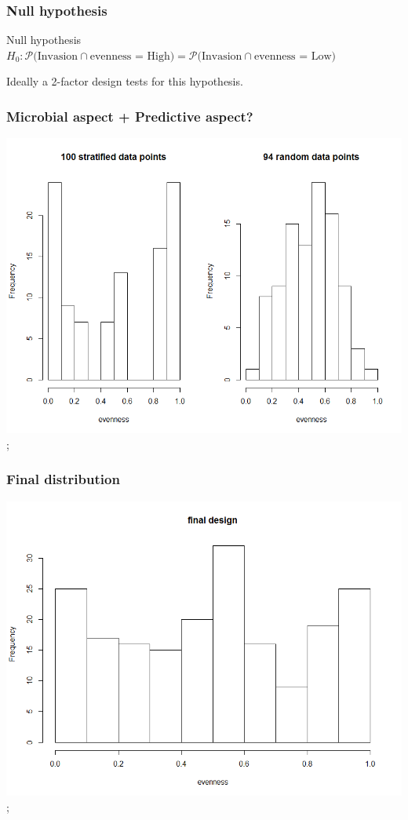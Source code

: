 \documentclass{beamer}
\begin{document}
\begin{frame}
\frametitle{Null hypothesis}
\begin{block}{Null hypothesis}
$
H_0: \mathcal{P(} \text{Invasion} \cap \text{evenness = High)} =\mathcal{P(} \text{Invasion} \cap \text{evenness = Low)}
$
\end{block}
\vspace*{.05in}
Ideally a 2-factor design tests for this hypothesis.


\end{frame}

\begin{frame}
\frametitle{Microbial aspect + Predictive aspect?}
\includegraphics[scale = .3]{stratrandom.png};
\end{frame}

\begin{frame}
\frametitle{Final distribution}
\includegraphics[scale = .3]{finalplot.png};
\end{frame}
\end{document}
